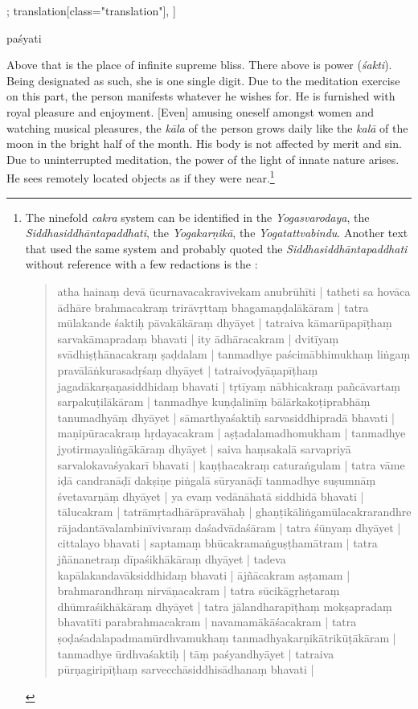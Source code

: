 \begin{alignment}[
  texts=edition[class="edition"];
  translation[class="translation"],
  ]
\begin{edition}
\begin{prose}
{  
  }
paśyati\dd{}
    \end{prose}
  \end{edition}
  \begin{translation}
    \begin{tlate}
      Above that is the place of infinite supreme bliss. There above is power (\textit{śakti}). Being designated as such, she is one single digit. Due to the meditation exercise on this part, the person manifests whatever he wishes for. He is furnished with royal pleasure and enjoyment. [Even] amusing oneself amongst women and watching musical pleasures, the \textit{kāla} of the person grows daily like the \textit{kalā} of the moon in the bright half of the month. His body is not affected by merit and sin. Due to uninterrupted meditation, the power of the light of innate nature arises. He sees remotely located objects as if they were near.\footnote{The ninefold \textit{cakra} system can be identified in the \textit{Yogasvarodaya}, the \textit{Siddhasiddhāntapaddhati}, the \textit{Yogakarṇikā}, the \textit{Yogatattvabindu}. Another text that used the same system and probably quoted the \textit{Siddhasiddhāntapaddhati} without reference with a few redactions is the :
        \begin{quote}
          atha hainaṃ devā ūcurnavacakravivekam anubrūhīti | tatheti sa hovāca ādhāre brahmacakraṃ trirāvṛttaṃ bhagamaṇḍalākāram | tatra mūlakande śaktiḥ pāvakākāraṃ dhyāyet | tatraiva kāmarūpapīṭhaṃ sarvakāmapradaṃ bhavati | ity ādhāracakram | dvitīyaṃ svādhiṣṭhānacakraṃ ṣaḍdalam | tanmadhye paścimābhimukhaṃ liṅgaṃ pravālāṅkurasadṛśaṃ dhyāyet | tatraivoḍyāṇapīṭhaṃ jagadākarṣaṇasiddhidaṃ bhavati | tṛtīyaṃ nābhicakraṃ pañcāvartaṃ sarpakuṭilākāram | tanmadhye kuṇḍalinīṃ bālārkakoṭiprabhāṃ tanumadhyāṃ dhyāyet | sāmarthyaśaktiḥ sarvasiddhipradā bhavati | maṇipūracakraṃ hṛdayacakram | aṣṭadalamadhomukham | tanmadhye jyotirmayaliṅgākāraṃ dhyāyet | saiva haṃsakalā sarvapriyā sarvalokavaśyakarī bhavati | kaṇṭhacakraṃ caturaṅgulam | tatra vāme iḍā candranāḍī dakṣiṇe piṅgalā sūryanāḍī tanmadhye suṣumnāṃ śvetavarṇāṃ dhyāyet | ya evaṃ vedānāhatā siddhidā bhavati | tālucakram | tatrāmṛtadhārāpravāhaḥ | ghaṇṭikāliṅgamūlacakrarandhre rājadantāvalambinīvivaraṃ daśadvādaśāram | tatra śūnyaṃ dhyāyet | cittalayo bhavati | saptamaṃ bhūcakramaṅguṣṭhamātram | tatra jñānanetraṃ dīpaśikhākāraṃ dhyāyet | tadeva kapālakandavāksiddhidaṃ bhavati | ājñācakram aṣṭamam | brahmarandhraṃ nirvāṇacakram | tatra sūcikāgṛhetaraṃ dhūmraśikhākāraṃ dhyāyet | tatra jālandharapīṭhaṃ mokṣapradaṃ bhavatīti parabrahmacakram | navamamākāśacakram | tatra ṣoḍaśadalapadmamūrdhvamukhaṃ tanmadhyakarṇikātrikūṭākāram | tanmadhye ūrdhvaśaktiḥ | tāṃ paśyandhyāyet | tatraiva pūrṇagiripīṭhaṃ sarvecchāsiddhisādhanaṃ bhavati |

\end{quote}}
\end{tlate}
\end{translation}
\end{alignment}
